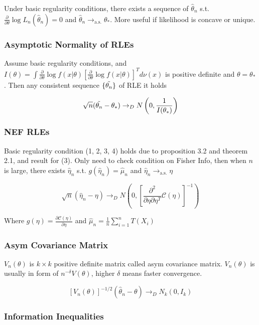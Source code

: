 Under basic regularity conditions, there exists a sequence of $\hat\theta_n$ s.t. $\frac{\partial}{\partial\theta}\log L_n(\hat\theta_n)=0$ and $\hat\theta_n\rightarrow_{\text{a.s.}}\theta_*$. More useful if likelihood is concave or unique.

\subsubsection{Asymptotic Normality of RLEs}

Assume basic regularity conditions, and $I(\theta) = \int \frac{\partial}{\partial\theta} \log f(x|\theta) \left[\frac{\partial}{\partial\theta}\log f(x|\theta)\right]^T d\nu(x)$ is positive definite and $\theta=\theta_*$. Then any consistent sequence $\{\Tilde{\theta_n}\}$ of RLE it holds

$$
\sqrt{n}(\Tilde{\theta_n} - \theta_*) \rightarrow_D N\left(0, \frac{1}{I(\theta_*)}\right)
$$

\subsubsection{NEF RLEs}

Basic regularity condition (1, 2, 3, 4) holds due to proposition 3.2 and theorem 2.1, and result for (3). Only need to check condition on Fisher Info, then when $n$ is large, there exists $\hat\eta_n$ s.t. $g(\hat\eta_n)=\hat\mu_n$ and $\hat\eta_n\rightarrow_{\text{a.s.}}\eta$

$$
\sqrt{n}(\hat\eta_n - \eta) \rightarrow_D N\left(
    0, \left[
        \frac{\partial^2}{\partial\eta\partial\eta^T} \mathcal{C}(\eta)
    \right]^{-1}
\right)
$$

Where $g(\eta) = \frac{\partial\mathcal{C}(\eta)}{\partial\eta}$ and $\hat\mu_n=\frac{1}{n}\sum_{i=1}^n T(X_i)$

\subsubsection{Asym Covariance Matrix}
$V_n(\theta)$ is $k\times k$ positive definite matrix called asym covariance matrix. $V_n(\theta)$ is usually in form of $n^{-\delta}V(\theta)$, higher $\delta$ means faster convergence.

$$
[V_n(\theta)]^{-1/2}(\hat\theta_n-\theta)\rightarrow_D N_k(0, I_k)
$$

\subsubsection{Information Inequalities}

